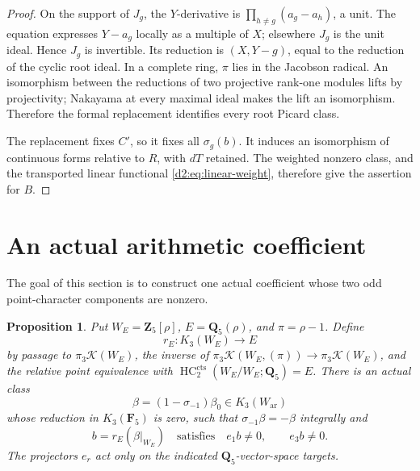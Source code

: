 \documentclass[11pt,a4paper]{amsart}
\numberwithin{equation}{section}
\newtheorem{proposition}[theorem]{Proposition}
\theoremstyle{definition}
\theoremstyle{remark}
\newcommand{\DtwoZZ}{\mathbf{Z}}
\newcommand{\DtwoQQ}{\mathbf{Q}}
\newcommand{\DtwoFF}{\mathbf{F}}
\newcommand{\DtwocK}{\mathcal K}
\newcommand{\Dtwocts}{\mathrm{cts}}
\newcommand{\Dtwoar}{\mathrm{ar}}
\DeclareMathOperator{\DtwoHC}{HC}
\begin{document}
\begin{proof}
On the support of \(J_g\), the \(Y\)-derivative is
\(\prod_{h\ne g}(a_g-a_h)\), a unit.
The equation expresses \(Y-a_g\) locally as a multiple of \(X\);
elsewhere \(J_g\) is the unit ideal.
Hence \(J_g\) is invertible.
Its reduction is \((X,Y-g)\), equal to the reduction of the cyclic
root ideal.
In a complete ring, \(\pi\) lies in the Jacobson radical.
An isomorphism between the reductions of two projective rank-one
modules lifts by projectivity; Nakayama at every maximal ideal
makes the lift an isomorphism.
Therefore the formal replacement identifies every root Picard class.

The replacement fixes \(C'\), so it fixes all \(\sigma_g(b)\).
It induces an isomorphism of continuous forms relative to \(R\),
with \(dT\) retained.
The weighted nonzero class, and the transported linear functional
\eqref{d2:eq:linear-weight}, therefore give the assertion for \(B\).
\end{proof}

\section{An actual arithmetic coefficient}\label{d2:sec:arithmetic}

The goal of this section is to construct one actual coefficient whose
two odd point-character components are nonzero.

\begin{proposition}\label{d2:prop:coefficient}
Put \(W_E=\DtwoZZ_5[\rho]\), \(E=\DtwoQQ_5(\rho)\), and
\(\pi=\rho-1\).
Define
\[
 r_E\colon K_3(W_E)\longrightarrow E
\]
by passage to \(\pi_3\DtwocK(W_E)\), the inverse of
\(\pi_3\DtwocK(W_E,(\pi))\to\pi_3\DtwocK(W_E)\), and the relative point
equivalence with \(\DtwoHC_2^\Dtwocts(W_E/W_E;\DtwoQQ_5)=E\).
There is an actual class
\[
 \beta=(1-\sigma_{-1})\beta_0\in K_3(W_{\Dtwoar})
\]
whose reduction in \(K_3(\DtwoFF_5)\) is zero, such that
\(\sigma_{-1}\beta=-\beta\) integrally and
\[
 b=r_E(\beta|_{W_E})
 \quad\text{satisfies}\quad e_1b\ne0,\qquad e_3b\ne0.
\]
The projectors \(e_r\) act only on the indicated
\(\DtwoQQ_5\)-vector-space targets.
\end{proposition}
\end{document}

